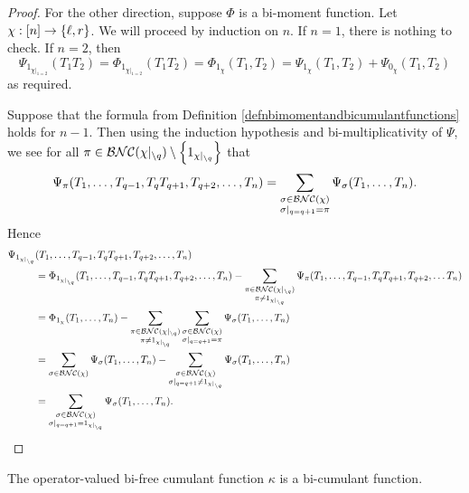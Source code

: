 \begin{proof}
			For the other direction, suppose $\Phi$ is a bi-moment function.
			Let $\chi : [n] \to \left\{\ell, r\right\}$.
			We will proceed by induction on $n$.
			If $n = 1$, there is nothing to check.
			If $n = 2$, then
			\[
				\Psi_{1_{\chi|_{1=2}}}(T_1T_2) = \Phi_{1_{\chi|_{1=2}}}(T_1T_2) = \Phi_{1_\chi}(T_1, T_2) = \Psi_{1_\chi}(T_1, T_2) + \Psi_{0_\chi}(T_1, T_2)
			\]
			as required.
			\par 
			Suppose that the formula from Definition \ref{defnbimomentandbicumulantfunctions} holds for $n-1$.
			Then using the induction hypothesis and bi-multiplicativity of $\Psi$, we see for all $\pi \in \mathcal{BNC}(\chi|_{\setminus q}) \setminus \left\{1_{\chi|_{\setminus q}}\right\}$ that
			\[
				\Psi_{\pi}(T_1, \ldots, T_{q-1}, T_qT_{q+1}, T_{q+2}, \ldots, T_n) = \sum_{\substack{\sigma \in \mathcal{BNC}(\chi) \\ \sigma|_{q = q+1} = \pi}} \Psi_\sigma(T_1, \ldots, T_n).
			\]
			Hence
			\begin{align*}
				\Psi_{1_{\chi|_{\setminus q}}}&(T_1, \ldots, T_{q-1}, T_qT_{q+1}, T_{q+2}, \ldots, T_n) \\
				&= \Phi_{1_{\chi|_{\setminus q}}}(T_1, \ldots, T_{q-1}, T_qT_{q+1}, T_{q+2}, \ldots, T_n) - \sum_{\substack{\pi \in \mathcal{BNC}(\chi|_{\setminus q}) \\
				\pi \neq 1_{\chi|_{\setminus q}}}}
				\Psi_{\pi}(T_1, \ldots, T_{q-1}, T_qT_{q+1}, T_{q+2}, \ldots T_n) \\
				&= \Phi_{1_{\chi}}(T_1, \ldots, T_n) - \sum_{\substack{\pi \in \mathcal{BNC}(\chi|_{\setminus q}) \\
				\pi \neq 1_{\chi|_{\setminus q}}}} \sum_{\substack{\sigma \in \mathcal{BNC}(\chi) \\ \sigma|_{q = q+1} = \pi}} \Psi_\sigma(T_1, \ldots, T_n)
				\\
				&= \sum_{\sigma\in \mathcal{BNC}(\chi)}\Psi_{\sigma}(T_1, \ldots, T_n) - \sum_{\substack{\sigma \in \mathcal{BNC}(\chi) \\ \sigma|_{q = q+1} \neq 1_{\chi|_{\setminus q}}}} \Psi_\sigma(T_1, \ldots, T_n)
				\\
				&= \sum_{\substack{\sigma \in \mathcal{BNC}(\chi) \\ \sigma|_{q = q+1} = 1_{\chi|_{\setminus q}}}} \Psi_\sigma(T_1, \ldots, T_n). \qedhere
			\end{align*}
		\end{proof}

		\begin{corollary}
			\label{corcumulantfunctionisabicumulantfunction}
			The operator-valued bi-free cumulant function $\kappa$ is a bi-cumulant function.
		\end{corollary}







